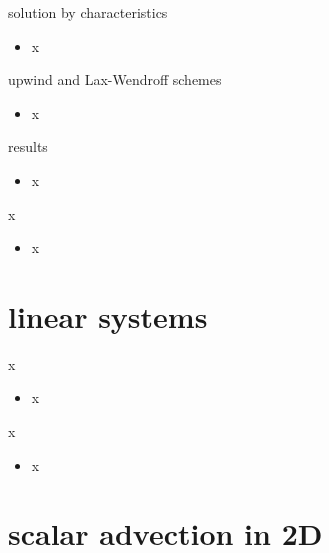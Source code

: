 \documentclass[10pt,hyperref]{beamer}
\begin{document}
\begin{frame}{solution by characteristics}

\begin{itemize}
\item x
\end{itemize}
\end{frame}


\begin{frame}{upwind and Lax-Wendroff schemes}

\begin{itemize}
\item x
\end{itemize}
\end{frame}


\begin{frame}{results}

\begin{itemize}
\item x
\end{itemize}
\end{frame}


\begin{frame}{x}

\begin{itemize}
\item x
\end{itemize}
\end{frame}


\section{linear systems}

\begin{frame}{x}

\begin{itemize}
\item x
\end{itemize}
\end{frame}


\begin{frame}{x}

\begin{itemize}
\item x
\end{itemize}
\end{frame}



\section{scalar advection in 2D}
\end{document}
